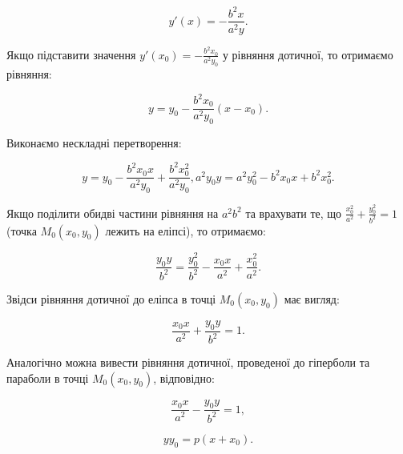 $$y'(x) = -\frac{b^2x}{a^2y}.$$

Якщо підставити значення $y'(x_0) = -\frac{b^2x_0}{a^2y_0}$
у рівняння дотичної, то отримаємо рівняння:

$$y = y_0 -\frac{b^2x_0}{a^2y_0}(x - x_0).$$

Виконаємо нескладні перетворення:

$$y = y_0 -\frac{b^2x_0x}{a^2y_0} +\frac{b^2x_0^2}{a^2y_0}, a^2y_0y = a^2y_0^2 - b^2x_0x + b^2x_0^2.$$

Якщо поділити обидві частини рівняння на $a^2b^2$ та врахувати те, що
$\frac{x_0^2}{a^2} + \frac{y_0^2}{b^2} = 1$ (точка $M_0(x_0,y_0)$ лежить на еліпсі), то отримаємо:

$$\frac{y_0y}{b^2} = \frac{y_0^2}{b^2} - \frac{x_0x}{a^2} + \frac{x_0^2}{a^2}.$$

Звідси рівняння дотичної до еліпса в точці $M_0(x_0,y_0)$ має вигляд:

$$\frac{x_0x}{a^2} + \frac{y_0y}{b^2} = 1.$$

Аналогічно можна вивести рівняння дотичної, проведеної до гіперболи та
параболи в точці $M_0(x_0,y_0)$, відповідно: 

$$\frac{x_0x}{a^2} - \frac{y_0y}{b^2} = 1,$$

$$yy_0 = p(x + x_0).$$




